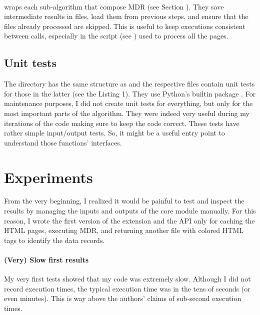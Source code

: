 \documentclass[10pt]{article}
\begin{document}
\paragraph{}

wraps each sub-algorithm that compose MDR (see Section ). They save intermediate results in files, load them from previous steps, and ensure that the files already processed are skipped. This is useful to keep executions consistent between calls, especially in the script (see ) used to process all the pages.



\subsection{Unit tests}

The directory  has the same structure as  and the respective files contain unit tests for those in the latter (see the Listing 1). They use Python's builtin package . For maintenance purposes, I did not create unit tests for everything, but only for the most important parts of the algorithm. They were indeed very useful during my iterations of the code making sure to keep the code correct. These tests have rather simple input/output tests. So, it might be a useful entry point to understand those functions' interfaces. 



\section{Experiments}

From the very beginning, I realized it would be painful to test and inspect the results by managing the inputs and outputs of the core module manually. For this reason, I wrote the first version of the extension and the API only for caching the HTML pages, executing MDR, and returning another file with colored HTML tags to identify the data records.

\paragraph{(Very) Slow first results} 

My very first tests showed that my code was extremely slow. Although I did not record execution times, the typical execution time was in the tens of seconds (or even minutes). This is way above the authors' claims of sub-second execution times.
\end{document}
